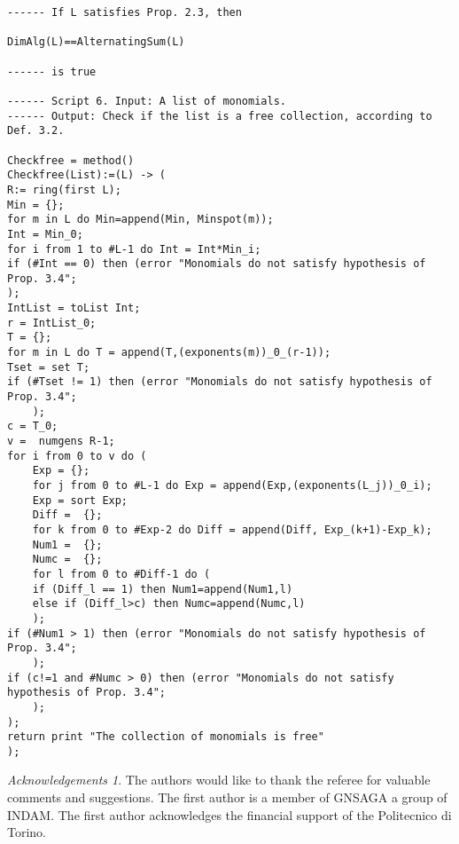 \documentclass{amsart}
\theoremstyle{plain}
\theoremstyle{definition}
\theoremstyle{remark}
\newtheorem*{Acknowledgement}{Acknowledgements}
\begin{document}
\begin{verbatim}
------ If L satisfies Prop. 2.3, then

DimAlg(L)==AlternatingSum(L)

------ is true

------ Script 6. Input: A list of monomials.
------ Output: Check if the list is a free collection, according to Def. 3.2.

Checkfree = method()
Checkfree(List):=(L) -> (
R:= ring(first L);
Min = {};
for m in L do Min=append(Min, Minspot(m));
Int = Min_0;
for i from 1 to #L-1 do Int = Int*Min_i;
if (#Int == 0) then (error "Monomials do not satisfy hypothesis of Prop. 3.4";
);
IntList = toList Int;
r = IntList_0;
T = {};
for m in L do T = append(T,(exponents(m))_0_(r-1));
Tset = set T;
if (#Tset != 1) then (error "Monomials do not satisfy hypothesis of Prop. 3.4";
    );
c = T_0;
v =  numgens R-1;
for i from 0 to v do (
    Exp = {};
    for j from 0 to #L-1 do Exp = append(Exp,(exponents(L_j))_0_i);
    Exp = sort Exp;
    Diff =  {};
    for k from 0 to #Exp-2 do Diff = append(Diff, Exp_(k+1)-Exp_k);
    Num1 =  {};
    Numc =  {};
    for l from 0 to #Diff-1 do (
    if (Diff_l == 1) then Num1=append(Num1,l)
    else if (Diff_l>c) then Numc=append(Numc,l)
    );
if (#Num1 > 1) then (error "Monomials do not satisfy hypothesis of Prop. 3.4";
    );
if (c!=1 and #Numc > 0) then (error "Monomials do not satisfy hypothesis of Prop. 3.4";
    );
);
return print "The collection of monomials is free"
);
\end{verbatim}
\vspace{1cm}

\begin{Acknowledgement}

The authors would like to thank the referee for valuable comments and suggestions. The first author is a member of GNSAGA a group of INDAM. The first author acknowledges the financial support of the Politecnico di Torino.

\end{Acknowledgement}



\nocite{*}


\end{document}
